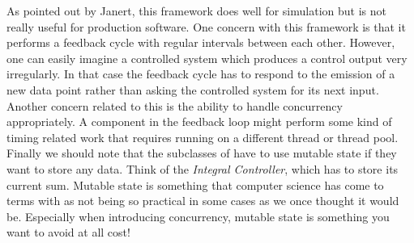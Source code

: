 As pointed out by Janert, this framework does well for simulation but is not really useful for production software. One concern with this framework is that it performs a feedback cycle with regular intervals between each other. However, one can easily imagine a controlled system which produces a control output very irregularly. In that case the feedback cycle has to respond to the emission of a new data point rather than asking the controlled system for its next input. Another concern related to this is the ability to handle concurrency appropriately. A component in the feedback loop might perform some kind of timing related work that requires running on a different thread or thread pool. Finally we should note that the subclasses of  have to use mutable state if they want to store any data. Think of the \textit{Integral Controller}, which has to store its current sum. Mutable state is something that computer science has come to terms with as not being so practical in some cases as we once thought it would be. Especially when introducing concurrency, mutable state is something you want to avoid at all cost!
